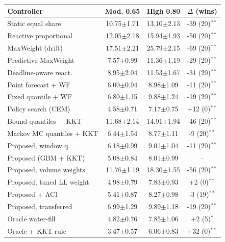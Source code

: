 \begin{tabular}{lccc}
\hline
Controller & Mod. 0.65 & High 0.80 & $\Delta$ (wins) \\
\hline
Static equal share & 10.75$\pm$1.71 & 13.10$\pm$2.13 & -39 (20)$^{\ast\ast}$ \\
Reactive proportional & 12.05$\pm$2.18 & 15.94$\pm$1.93 & -50 (20)$^{\ast\ast}$ \\
MaxWeight (drift) & 17.51$\pm$2.21 & 25.79$\pm$2.15 & -69 (20)$^{\ast\ast}$ \\
Predictive MaxWeight & 7.57$\pm$0.99 & 11.36$\pm$1.19 & -29 (20)$^{\ast\ast}$ \\
Deadline-aware react. & 8.95$\pm$2.04 & 11.53$\pm$1.67 & -31 (20)$^{\ast\ast}$ \\
Point forecast + WF & 6.00$\pm$0.94 & 8.98$\pm$1.09 & -11 (20)$^{\ast\ast}$ \\
Fixed quantile + WF & 6.80$\pm$1.15 & 9.88$\pm$1.24 & -19 (20)$^{\ast\ast}$ \\
Policy search (CEM) & 4.58$\pm$0.71 & 7.17$\pm$0.75 & +12 (0)$^{\ast\ast}$ \\
Bound quantiles + KKT & 11.68$\pm$2.14 & 14.91$\pm$1.94 & -46 (20)$^{\ast\ast}$ \\
Markov MC quantiles + KKT & 6.44$\pm$1.54 & 8.77$\pm$1.11 & -9 (20)$^{\ast\ast}$ \\
Proposed, window q. & 6.18$\pm$0.99 & 9.01$\pm$1.04 & -11 (20)$^{\ast\ast}$ \\
Proposed (GBM + KKT) & 5.08$\pm$0.84 & 8.01$\pm$0.99 & -- \\
Proposed, volume weights & 11.76$\pm$1.19 & 18.30$\pm$1.55 & -56 (20)$^{\ast\ast}$ \\
Proposed, tuned LL weight & 4.98$\pm$0.79 & 7.83$\pm$0.93 & +2 (0)$^{\ast\ast}$ \\
Proposed + ACI & 5.41$\pm$0.87 & 8.27$\pm$0.98 & -3 (19)$^{\ast\ast}$ \\
Proposed, transferred & 6.99$\pm$1.29 & 9.89$\pm$1.18 & -19 (20)$^{\ast\ast}$ \\
Oracle water-fill & 4.82$\pm$0.76 & 7.85$\pm$1.06 & +2 (5)$^{\ast}$ \\
Oracle + KKT rule & 3.47$\pm$0.57 & 6.06$\pm$0.83 & +32 (0)$^{\ast\ast}$ \\
\hline
\end{tabular}
